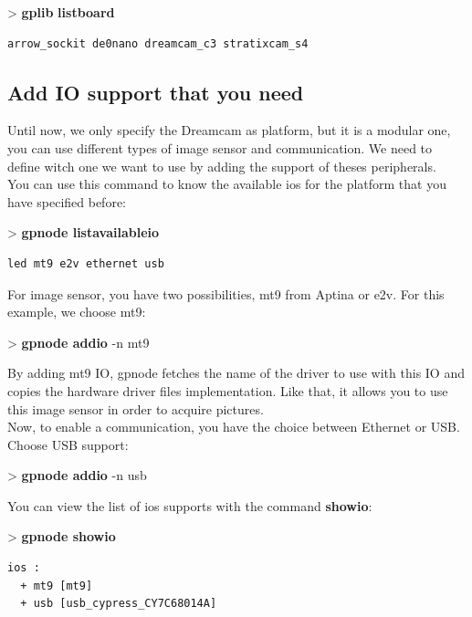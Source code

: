 \documentclass[10pt,a4paper]{article}
\begin{document}
\begin{sample}
> \textbf{gplib} \textbf{listboard}
\begin{Verbatim}
arrow_sockit de0nano dreamcam_c3 stratixcam_s4
\end{Verbatim}
\end{sample}

\subsection{Add IO support that you need}
Until now, we only specify the Dreamcam as platform, but it is a modular one, you can use different types of image sensor and communication. We need to define witch one we want to use by adding the support of theses peripherals. \\

You can use this command to know the available ios for the platform that you have specified before:
\begin{sample}
> \textbf{gpnode listavailableio}
\begin{Verbatim}
led mt9 e2v ethernet usb
\end{Verbatim}
\end{sample}

For image sensor, you have two possibilities, mt9 from Aptina or e2v. For this example, we choose mt9:

\begin{sample}
> \textbf{gpnode addio} -n mt9
\end{sample}

By adding mt9 IO, gpnode fetches the name of the driver to use with this IO and copies the hardware driver files implementation. Like that, it allows you to use this image sensor in order to acquire pictures.\\

Now, to enable a communication, you have the choice between Ethernet or USB. Choose USB support:

\begin{sample}
> \textbf{gpnode addio} -n usb
\end{sample}

You can view the list of ios supports with the command \textbf{showio}:

\begin{sample}
> \textbf{gpnode showio}
\begin{Verbatim}
ios :
  + mt9 [mt9]
  + usb [usb_cypress_CY7C68014A]
\end{Verbatim}
\end{sample}
\end{document}
